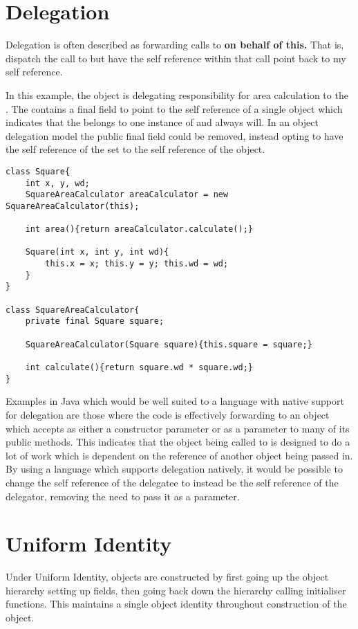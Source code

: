 \section{Delegation}
Delegation is often described as forwarding  calls to  \textbf{on behalf of this.} That is, dispatch the call to  but have the self reference within that call point back to my self reference.
\newline

In this example, the  object is delegating responsibility for area calculation to the . The  contains a final field to point to the self reference of a single  object which indicates that the  belongs to one instance of  and always will. In an object delegation model the public final field could be removed, instead opting to have the self reference of the  set to the self reference of the  object.
\begin{lstlisting}
class Square{
	int x, y, wd;
	SquareAreaCalculator areaCalculator = new SquareAreaCalculator(this);

	int area(){return areaCalculator.calculate();}

	Square(int x, int y, int wd){
		this.x = x; this.y = y; this.wd = wd;
	}
}

class SquareAreaCalculator{
	private final Square square;

	SquareAreaCalculator(Square square){this.square = square;}

	int calculate(){return square.wd * square.wd;}
}
\end{lstlisting}

Examples in Java which would be well suited to a language with native support for delegation are those where the code is effectively forwarding to an object which accepts  as either a constructor parameter or as a parameter to many of its public methods. This indicates that the object being called to is designed to do a lot of work which is dependent on the  reference of another object being passed in. By using a language which supports delegation natively, it would be possible to change the self reference of the delegatee to instead be the self reference of the delegator, removing the need to pass it as a parameter.

\section{Uniform Identity}
Under Uniform Identity, objects are constructed by first going up the object hierarchy setting up fields, then going back down the hierarchy calling initialiser functions. This maintains a single object identity throughout construction of the object.
\newline

